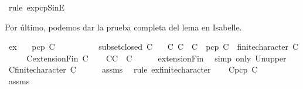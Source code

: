 \begin{isabellebody}
\ {\isacharparenleft}rule\ ex{}{\isacharunderscore}pcp{\isacharunderscore}SinE{\isacharparenright}\isanewline
\ \ \isamarkupfalse%
\isanewline
{}\isamarkupfalse%
%
\endisatagproof
{\isafoldproof}%
%
\isadelimproof
%
\endisadelimproof
%
\begin{isamarkuptext}%
Por último, podemos dar la prueba completa del lema  en Isabelle.%
\end{isamarkuptext}\isamarkuptrue%
\isamarkupfalse%
\ ex{}{\isacharcolon}\isanewline
\ \ \ {\isachardoublequoteopen}pcp\ C{\isachardoublequoteclose}\isanewline
\ \ \ \ \ \ \ \ \ \ {\isachardoublequoteopen}subset{\isacharunderscore}closed\ C{\isachardoublequoteclose}\isanewline
\ \ \ {\isachardoublequoteopen}{\isasymexists}C{\isacharprime}{\isachardot}\ C\ {\isasymsubseteq}\ C{\isacharprime}\ {\isasymand}\ pcp\ C{\isacharprime}\ {\isasymand}\ finite{\isacharunderscore}character\ C{\isacharprime}{\isachardoublequoteclose}\isanewline
%
\isadelimproof
%
\endisadelimproof
%
\isatagproof
{}\isamarkupfalse%
\ {\isacharminus}\isanewline
\ \ \isamarkupfalse%
\ {\isacharquery}C{\isacharprime}{\isacharequal}{\isachardoublequoteopen}extensionFin\ C{\isachardoublequoteclose}\isanewline
\ \ \isamarkupfalse%
\ C{}{\isacharcolon}{\isachardoublequoteopen}C\ {\isasymsubseteq}\ {\isacharquery}C{\isacharprime}{\isachardoublequoteclose}\isanewline
\ \ \ \ \isamarkupfalse%
\ extensionFin\ \isamarkupfalse%
\ {\isacharparenleft}simp\ only{\isacharcolon}\ Un{\isacharunderscore}upper{}{\isacharparenright}\isanewline
\ \ \isamarkupfalse%
\ C{}{\isacharcolon}{\isachardoublequoteopen}finite{\isacharunderscore}character\ {\isacharparenleft}{\isacharquery}C{\isacharprime}{\isacharparenright}{\isachardoublequoteclose}\isanewline
\ \ \ \ \isamarkupfalse%
\ assms{\isacharparenleft}{}{\isacharparenright}\ \isamarkupfalse%
\ {\isacharparenleft}rule\ ex{}{\isacharunderscore}finite{\isacharunderscore}character{\isacharparenright}\isanewline
\ \ \isamarkupfalse%
\ C{}{\isacharcolon}{\isachardoublequoteopen}pcp\ {\isacharparenleft}{\isacharquery}C{\isacharprime}{\isacharparenright}{\isachardoublequoteclose}\isanewline
\ \ \ \ \isamarkupfalse%
\ assms\ \isamarkupfalse%

\end{isabellebody}
